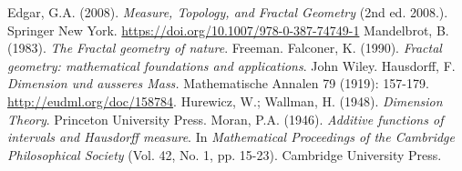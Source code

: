 \begin{thebibliography}{99}
    
 Edgar, G.A. (2008). \textit{Measure, Topology, and Fractal Geometry} (2nd ed. 2008.). Springer New York. \url{https://doi.org/10.1007/978-0-387-74749-1}
 Mandelbrot, B. (1983). \textit{The Fractal geometry of nature}. Freeman.
 Falconer, K. (1990). \textit{Fractal geometry: mathematical foundations and applications}. John Wiley.
 Hausdorff, F. \textit{Dimension und ausseres Mass.} Mathematische Annalen 79 (1919): 157-179. \url{http://eudml.org/doc/158784}.
Hurewicz, W.; Wallman, H. (1948). \textit{Dimension Theory}. Princeton University Press.
Moran, P.A. (1946). \textit{Additive functions of intervals and Hausdorff measure}. In \textit{Mathematical Proceedings of the Cambridge Philosophical Society} (Vol. 42, No. 1, pp. 15-23). Cambridge University Press.

\end{thebibliography}